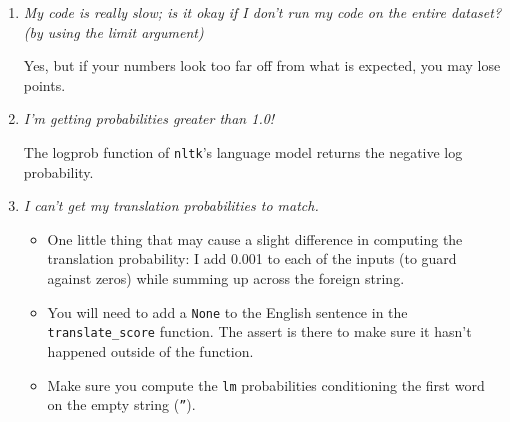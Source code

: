 \documentclass[11pt]{article}
\begin{document}
\begin{enumerate}

\item \textit{My code is really slow; is it okay if I don't run my code on the entire dataset?  (by using the limit argument)}

Yes, but if your numbers look too far off from what is expected, you may lose points.

\item \textit{I'm getting probabilities greater than 1.0!}

The logprob function of \texttt{nltk}'s language model returns the negative log probability.

\item \textit{I can't get my translation probabilities to match.}

\begin{itemize}
\item One little thing that may cause a slight difference in computing the translation probability: I add 0.001 to each of the inputs (to guard against zeros) while summing up across the foreign string.

\item You will need to add a \texttt{None} to the English sentence in the \texttt{translate\_score} function.  The assert is there to make sure it hasn't happened outside of the function.
 
\item Make sure you compute the \texttt{lm} probabilities conditioning the
  first word on the empty string (\texttt{''}).
\end{itemize}

\end{enumerate}
\end{document}
